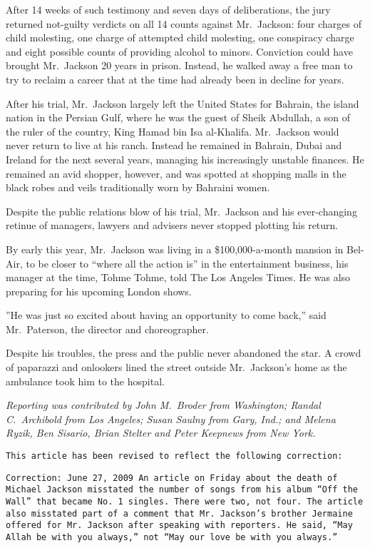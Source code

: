 ﻿\documentclass[12pt]{article}
\begin{document}
After 14 weeks of such testimony and seven days of deliberations, the jury returned not-guilty
verdicts on all 14 counts against Mr.~Jackson: four charges of child molesting, one charge of
attempted child molesting, one conspiracy charge and eight possible counts of providing alcohol to
minors. Conviction could have brought Mr.~Jackson 20 years in prison. Instead, he walked away a free
man to try to reclaim a career that at the time had already been in decline for years.

After his trial, Mr.~Jackson largely left the United States for Bahrain, the island nation in the
Persian Gulf, where he was the guest of Sheik Abdullah, a son of the ruler of the country, King
Hamad bin Isa al-Khalifa. Mr.~Jackson would never return to live at his ranch. Instead he remained
in Bahrain, Dubai and Ireland for the next several years, managing his increasingly unstable
finances. He remained an avid shopper, however, and was spotted at shopping malls in the black robes
and veils traditionally worn by Bahraini women.

Despite the public relations blow of his trial, Mr.~Jackson and his ever-changing retinue of
managers, lawyers and advisers never stopped plotting his return.

By early this year, Mr.~Jackson was living in a \$100,000-a-month mansion in Bel-Air, to be closer
to ``where all the action is'' in the entertainment business, his manager at the time, Tohme Tohme,
told The Los Angeles Times. He was also preparing for his upcoming London shows.

''He was just so excited about having an opportunity to come back,'' said Mr.~Paterson, the director
and choreographer.

Despite his troubles, the press and the public never abandoned the star. A crowd of paparazzi and
onlookers lined the street outside Mr.~Jackson's home as the ambulance took him to the hospital.

\textit{Reporting was contributed by John M.~Broder from Washington; Randal C.~Archibold from Los Angeles;
Susan Saulny from Gary, Ind.; and Melena Ryzik, Ben Sisario, Brian Stelter and Peter Keepnews from
New York.}

\texttt{This article has been revised to reflect the following correction:}

\texttt{Correction: June 27, 2009 An article on Friday about the death of Michael Jackson misstated the
number of songs from his album ``Off the Wall'' that became No.~1 singles. There were two, not four.
The article also misstated part of a comment that Mr.~Jackson's brother Jermaine offered for
Mr.~Jackson after speaking with reporters. He said, ``May Allah be with you always,'' not ``May our
love be with you always.''}
\end{document}
